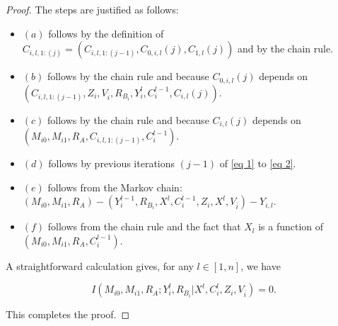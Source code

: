 \documentclass[10pt,a4paper]{amsart}
\begin{document}
\begin{proof}
The steps are justified as follows:
\begin{itemize}
    \item $(a)$ follows by the definition of $C_{i, l, 1:(j)} = (C_{i, l, 1:(j-1)}, C_{0, i,l}(j), C_{1, l}(j))$ and by the chain rule.
    \item $(b)$ follows by the chain rule and because $C_{0, i,l}(j)$ depends on\linebreak $(C_{i, l, 1:(j-1)}, Z_i, V_{\overline{i}}, R_{B_i}, Y_i^l, C_i^{l-1}, C_{i,l}(j))$.
    \item $(c)$ follows by the chain rule and because $C_{i,l}(j)$ depends on\linebreak $(M_{i0}, M_{i1}, R_A, C_{i, l, 1:(j-1)}, C_i^{l-1})$.
    \item $(d)$ follows by previous iterations $(j-1)$ of \eqref{eq 1} to \eqref{eq 2}.
    \item $(e)$ follows from the Markov chain:\linebreak $(M_{i0},M_{i1},R_A)-(Y_i^{l-1}, R_{B_i}, X^l, C_i^{l-1}, Z_i, X^l, V_{\overline{i}})-Y_{i,l}$.
    \item $(f)$ follows from the chain rule and the fact that $X_{l}$ is a function of\linebreak $(M_{i0}, M_{i1}, R_A, C_i^{l-1})$.
\end{itemize}

A straightforward calculation gives, for any $l \in [1, n]$, we have

\[
I(M_{i0}, M_{i1}, R_A; Y_i^l, R_{B_i} | X^l, C_i^{l}, Z_i, V_{\overline{i}}) = 0.
\]

This completes the proof.
\end{proof}
\end{document}
